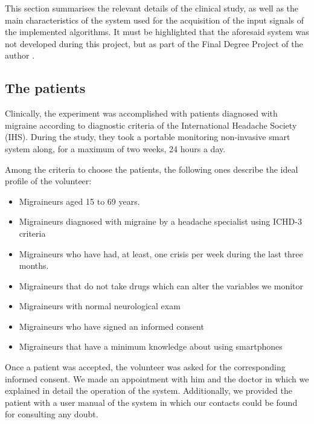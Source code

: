 \label{sec:experiment}

This section summarises the relevant details of the clinical study, as
well as the main characteristics of the system used for the
acquisition of the input signals of the implemented algorithms. It
must be highlighted that the aforesaid system was not developed during
this project, but as part of the Final Degree Project of the
author \cite{Irene:PFC:2014}.


\subsection{The patients}
\label{subsec:thepatients}

Clinically, the experiment was accomplished with patients diagnosed
with migraine according to diagnostic criteria of the International
Headache Society (IHS). During the study, they took a portable
monitoring non-invasive smart system along, for a maximum of two
weeks, 24 hours a day.

Among the criteria to choose the patients, the following ones describe
the ideal profile of the volunteer:
\begin{itemize}
	\item Migraineurs aged 15 to 69 years.

	\item Migraineurs diagnosed with migraine by a headache
	specialist using ICHD-3 criteria \cite{pmid23771276}

	\item Migraineurs who have had, at least, one crisis per week
	during the last three months.

	\item Migraineurs that do not take drugs which can alter the
	variables we monitor

	\item Migraineurs with normal neurological exam

	\item Migraineurs who have signed an informed consent

	\item Migraineurs that have a minimum knowledge about using
	smartphones
\end{itemize}

Once a patient was accepted, the volunteer was asked for the
corresponding informed consent. We made an appointment with him and
the doctor in which we explained in detail the operation of the
system. Additionally, we provided the patient with a user manual of
the system in which our contacts could be found for consulting any
doubt.


